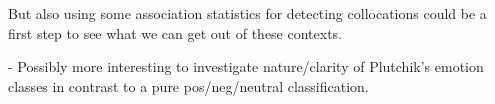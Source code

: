 But also using some association statistics for detecting collocations could be a first step to see what we can get out of these contexts.


- Possibly more interesting to investigate nature/clarity of Plutchik's emotion classes in contrast to a pure pos/neg/neutral classification. 




%
%
%
%
%
%
%
%
%
%
%
%
%
%
%
%
%
